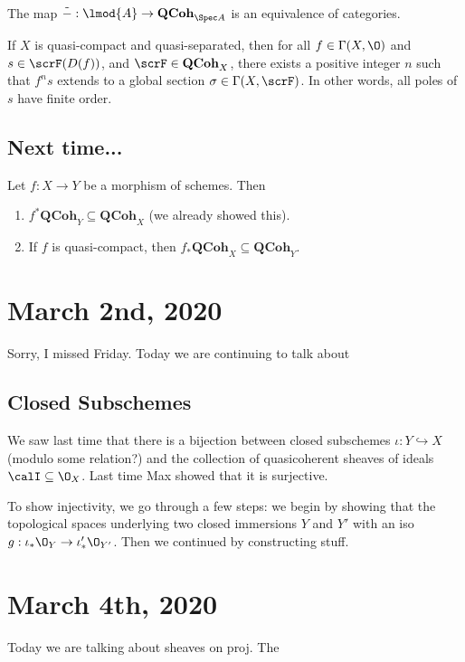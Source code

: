 \documentclass[12pt]{article}
\begin{document}
\begin{thm}
	The map $\tilde -:\lmod{A}\to \mathbf{QCoh}_{\Spec A}$ is an equivalence of categories.
\end{thm}
\begin{cor}
	If $X$ is quasi-compact and quasi-separated, then for all $f\in \Gamma(X,\O)$ and $s\in \scrF(D(f))$, and $\scrF\in \mathbf{QCoh}_X$,
	there exists a positive integer $n$ such that $f^ns$ extends to a global section $\sigma\in\Gamma(X,\scrF)$. In other words, 
	all poles of $s$ have finite order.
\end{cor}

\subsection{Next time...}
\begin{prop}
	Let $f:X\to Y$ be a morphism of schemes. Then 
	\begin{enumerate}
		\item $f^\ast\mathbf{QCoh}_Y\subseteq\mathbf{QCoh}_X$ (we already showed this).
		\item If $f$ is quasi-compact, then $f_\ast\mathbf{QCoh}_X\subseteq\mathbf{QCoh}_Y$.
	\end{enumerate}
\end{prop}

\section{March 2nd, 2020}
Sorry, I missed Friday. Today we are continuing to talk about 
\subsection{Closed Subschemes}
We saw last time that there is a bijection between closed subschemes $\iota:Y\hookrightarrow X$ (modulo some relation?) and the collection of quasicoherent sheaves of ideals $\calI\subseteq\O_X$.
Last time Max showed that it is surjective.

To show injectivity, we go through a few steps: we begin by showing that the topological spaces underlying 
two closed immersions $Y$ and $Y'$ with an iso $g:\iota_\ast\O_Y\to \iota'_\ast\O_{Y'}$. Then we continued by 
constructing stuff.

\section{March 4th, 2020}
Today we are talking about sheaves on proj. The 
\end{document}
